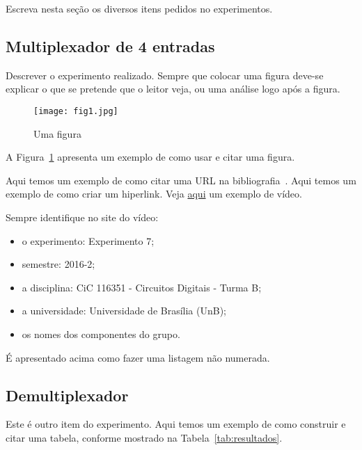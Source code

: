 \documentclass[12pt]{article}
\begin{document}
Escreva nesta seção os diversos itens pedidos no experimentos. 

\subsection{Multiplexador de 4 entradas}
\label{sec:Mux}

Descrever o experimento realizado. Sempre  que colocar uma figura deve-se explicar o que se pretende que o leitor veja, ou uma análise logo após a figura. 

\begin{figure}[H]
\centering
\texttt{[image: fig1.jpg]}
\caption{Uma figura}
\label{fig:exemplo}
\end{figure}

A Figura~\ref{fig:exemplo} apresenta um exemplo de como usar e citar uma figura.

Aqui temos um exemplo de como citar uma URL na bibliografia~\cite{systemverilog}.
Aqui temos um exemplo de como criar um hiperlink. Veja
\href{https://www.youtube.com/watch?v=EcNxjxKRQ6E}{aqui} um exemplo de vídeo.

Sempre identifique no site do vídeo:
\begin{itemize}
    \item o experimento: Experimento 7;
    \item semestre: 2016-2;
    \item a disciplina: CiC 116351 - Circuitos Digitais - Turma B;
    \item a universidade: Universidade de Brasília (UnB);
    \item os nomes dos componentes do grupo.
\end{itemize}

É apresentado acima como fazer uma listagem não numerada.

\subsection{Demultiplexador}
\label{sec:Demux}

Este é outro item do experimento.
Aqui temos um exemplo de como construir e citar uma tabela, conforme mostrado na Tabela~\ref{tab:resultados}.
\end{document}
